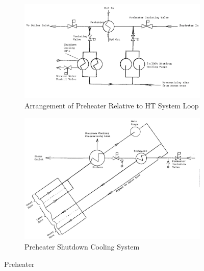 \documentclass[12pt]{article}
\begin{document}
\begin{figure}[h]
    \centering
    \begin{subfigure}{0.49\textwidth}
        \centering
        \includegraphics[width=\linewidth]{figs/shutdown_hts_1.jpg}
        \caption{Arrangement of Preheater Relative to HT System Loop}
        \label{fig:fig5a}
    \end{subfigure}
    \hfill
    \begin{subfigure}{0.49\textwidth}
        \centering
        \includegraphics[width=\linewidth]{figs/shutdown_hts_2.jpg}
        \caption{Preheater Shutdown Cooling System}
        \label{fig:fig5b}
    \end{subfigure}
    \caption{Preheater}
    \label{fig:5}
\end{figure}
\end{document}
